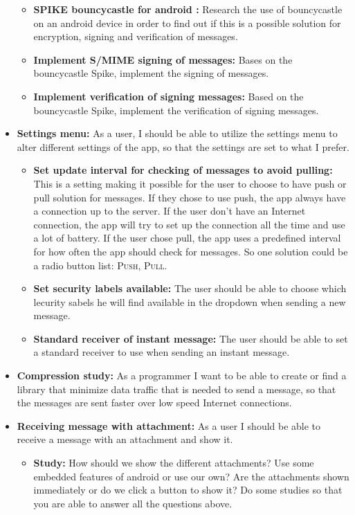 \begin{itemize}
\begin{itemize}
\item{}\textbf{SPIKE bouncycastle for android :} Research the use of bouncycastle on an android device in order to find out if this is a possible solution for encryption, signing and verification of messages.
\item{}\textbf{Implement S/MIME signing of messages:} Bases on the bouncycastle Spike, implement the signing of messages. 
\item{}\textbf{Implement verification of signing messages:} Based on the bouncycastle Spike, implement the verification of signing messages.
\end{itemize}

\newpage

\item{}\textbf{Settings menu:} As a user, I should be able to utilize the settings menu to alter different settings of the app, so that the settings are set to what I prefer.
\begin{itemize}
\item{}\textbf{Set update interval for checking of messages to avoid pulling:} This is a setting making it possible for the user to choose to have push or pull solution for messages. If they chose to use push, the app always have a connection up to the server. If the user don’t have an Internet connection, the app will try to set up the connection all the time and use a lot of battery. If the user chose pull, the app uses a predefined interval for how often the app should check for messages. So one solution could be a radio button list: \textsc{Push}, \textsc{Pull}.
\item{}\textbf{Set security labels available:} The user should be able to choose which lecurity sabels he will find available in the dropdown when sending a new message.
\item{}\textbf{Standard receiver of instant message:} The user should be able to set a standard receiver to use when sending an instant message.
\end{itemize}
\item{}\textbf{Compression study:} As a programmer I want to be able to create or find a library that minimize data traffic that is needed to send a message, so that the messages are sent faster over low speed Internet connections.
\item{}\textbf{Receiving message with attachment:} As a user I should be able to receive a message with an attachment and show it.
\begin{itemize}
\item{}\textbf{Study:} How should we show the different attachments? Use some embedded features of android or use our own? Are the attachments shown immediately or do we click a button to show it? Do some studies so that you are able to answer all the questions above.

\end{itemize}
\end{itemize}
